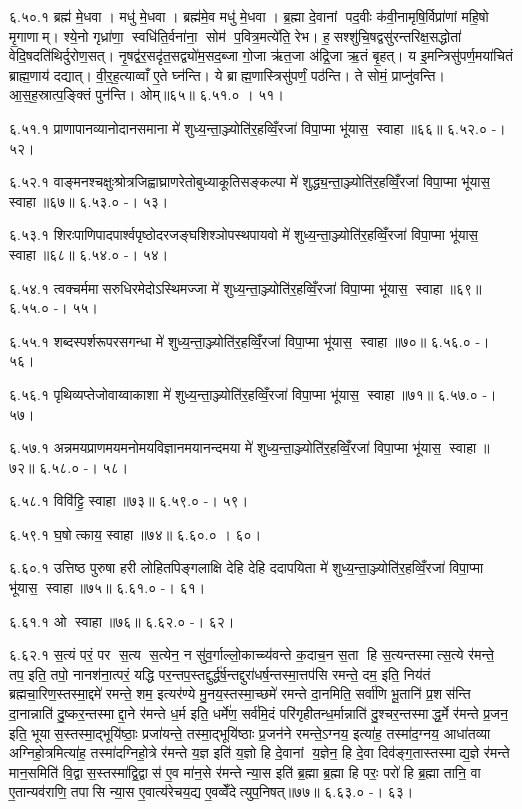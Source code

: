 ६.५०.१
ब्रह्म॑ मे॒धवा। मधु॑ मे॒धवा। ब्रह्म॑मे॒व मधु॑ मे॒धवा। ब्र॒ह्मा दे॒वानां पद॒वीः क॑वी॒नामृषि॒र्विप्रा॑णां महि॒षो मृ॒गाणाम्। श्ये॒नो गृध्रा॑णा॒ स्वधि॑ति॒र्वना॑ना॒ सोम॑ प॒वित्र॒मत्ये॑ति॒ रेभ\sn{}। ह॒सश्शु॑चि॒षद्वसु॑रन्तरिक्ष॒सद्धोता॑ वेदि॒षदति॑थिर्दुरोण॒सत्। नृ॒षद्व॑र॒सदृ॑त॒सद्व्यो॑म॒सद॒ब्जा गो॒जा ऋ॑त॒जा अ॑द्रि॒जा ऋ॒तं बृ॒हत्। य इ॒मन्त्रिसु॑पर्ण॒मया॑चितं ब्राह्म॒णाय॑ दद्यात्। वी॒र॒ह॒त्याव्वाँ ए॒ते घ्न॑न्ति। ये ब्राह्म॒णास्त्रिसु॑पर्णं॒ पठ॑न्ति। ते सोमं॒ प्राप्नु॑वन्ति। आ॒स॒ह॒स्रात्प॒ङ्क्तिं पुन॑न्ति। ओम्॥६५॥
६.५१.०
। ५१।
\anuvakamend

६.५१.१
प्राणापानव्यानोदानसमाना मे॑ शुध्य॒न्ता॒ञ्ज्योति॑र॒हव्विँ॒रजा॑ विपा॒प्मा भू॑यास॒ स्वाहा॥६६॥
६.५२.०
-। ५२।
\anuvakamend

६.५२.१
वाङ्मनश्चक्षुःश्रोत्रजिह्वाघ्राणरेतोबुध्याकूतिसङ्कल्पा मे॑ शुद्ध्य॒न्ता॒ञ्ज्योति॑र॒हव्विँ॒रजा॑ विपा॒प्मा भू॑यास॒ स्वाहा॥६७॥
६.५३.०
-। ५३।
\anuvakamend

६.५३.१
शिरःपाणिपादपार्श्वपृष्ठोदरजङ्घशिश्ञोपस्थपायवो मे॑ शुध्य॒न्ता॒ञ्ज्योति॑र॒हव्विँ॒रजा॑ विपा॒प्मा भू॑यास॒ स्वाहा॥६८॥
६.५४.०
-। ५४।
\anuvakamend

६.५४.१
त्वक्चर्ममासरुधिरमेदोऽस्थिमज्जा मे॑ शुध्य॒न्ता॒ञ्ज्योति॑र॒हव्विँ॒रजा॑ विपा॒प्मा भू॑यास॒ स्वाहा॥६९॥
६.५५.०
-। ५५।
\anuvakamend

६.५५.१
शब्दस्पर्शरूपरसगन्धा मे॑ शुध्य॒न्ता॒ञ्ज्योति॑र॒हव्विँ॒रजा॑ विपा॒प्मा भू॑यास॒ स्वाहा॥७०॥
६.५६.०
-। ५६।
\anuvakamend

६.५६.१
पृथिव्यप्तेजोवाय्वाकाशा मे॑ शुध्य॒न्ता॒ञ्ज्योति॑र॒हव्विँ॒रजा॑ विपा॒प्मा भू॑यास॒ स्वाहा॥७१॥
६.५७.०
-। ५७।
\anuvakamend

६.५७.१
अन्नमयप्राणमयमनोमयविज्ञानमयानन्दमया मे॑ शुध्य॒न्ता॒ञ्ज्योति॑र॒हव्विँ॒रजा॑ विपा॒प्मा भू॑यास॒ स्वाहा॥७२॥
६.५८.०
-। ५८।
\anuvakamend

६.५८.१
विवि॑ट्टि॒ स्वाहा॥७३॥
६.५९.०
-। ५९।
\anuvakamend

६.५९.१
घ॒षोत्काय॒ स्वाहा॥७४॥
६.६०.०
। ६०।
\anuvakamend

६.६०.१
उत्तिष्ठ पुरुषा हरी लोहितपिङ्गलाक्षि देहि देहि ददापयिता मे॑ शुध्य॒न्ता॒ञ्ज्योति॑र॒हव्विँ॒रजा॑ विपा॒प्मा भू॑यास॒ स्वाहा॥७५॥
६.६१.०
-। ६१।
\anuvakamend

६.६१.१
ओ स्वाहा॥७६॥
६.६२.०
-। ६२।
\anuvakamend

६.६२.१
स॒त्यं परं॒ पर स॒त्य स॒त्येन॒ न सु॑व॒र्गाल्लो॒काच्च्य॑वन्ते क॒दाच॒न स॒ता हि स॒त्यन्तस्मात्स॒त्ये र॑मन्ते॒ तप॒ इति॒ तपो॒ नानश॑ना॒त्परं॒ यद्धि पर॒न्तप॒स्तद्दुर्द्ध॑र्\mbox{}ष॒न्तद्दुरा॑धर्\mbox{}ष॒न्तस्मा॒त्तप॑सि रमन्ते॒ दम॒ इति॒ निय॑तं ब्रह्मचा॒रिण॒स्तस्मा॒द्दमे॑ रमन्ते॒ शम॒ इत्यर॑ण्ये मु॒नय॒स्तस्मा॒च्छमे॑ रमन्ते दा॒नमिति॒ सर्वा॑णि भू॒तानि॑ प्र॒शस॑न्ति दा॒नान्नाति॑ दु॒ष्कर॒न्तस्माद्दा॒ने र॑मन्ते ध॒र्म इति॒ धर्मे॑ण॒ सर्व॑मि॒दं परि॑गृहीतन्ध॒र्मान्नाति॑ दु॒श्चर॒न्तस्माद्ध॒र्मे र॑मन्ते प्र॒जन॒ इति॒ भूयास॒स्तस्मा॒द्भूयि॑ष्ठाः॒ प्रजा॑यन्ते॒ तस्मा॒द्भूयि॑ष्ठाः प्र॒जन॑ने रमन्ते॒ऽग्नय॒ इत्या॑ह॒ तस्मा॑द॒ग्नय॒ आधा॑तव्या अग्निहो॒त्रमित्या॑ह॒ तस्मा॑दग्निहो॒त्रे र॑मन्ते य॒ज्ञ इति॑ य॒ज्ञो हि दे॒वानां य॒ज्ञेन॒ हि दे॒वा दिव॑ङ्ग॒तास्तस्माद्य॒ज्ञे र॑मन्ते मान॒समिति॑ वि॒द्वास॒स्तस्मा॑द्वि॒द्वास॑ ए॒व मा॑न॒से र॑मन्ते न्या॒स इति॑ ब्र॒ह्मा ब्र॒ह्मा हि परः॒ परो॑ हि ब्र॒ह्मा तानि॒ वा ए॒तान्यव॑राणि॒ तपासि न्या॒स ए॒वात्य॑रेचय॒द्य ए॒वव्वेँदेत्युप॒निषत्॥७७॥
६.६३.०
-। ६३।
\anuvakamend

